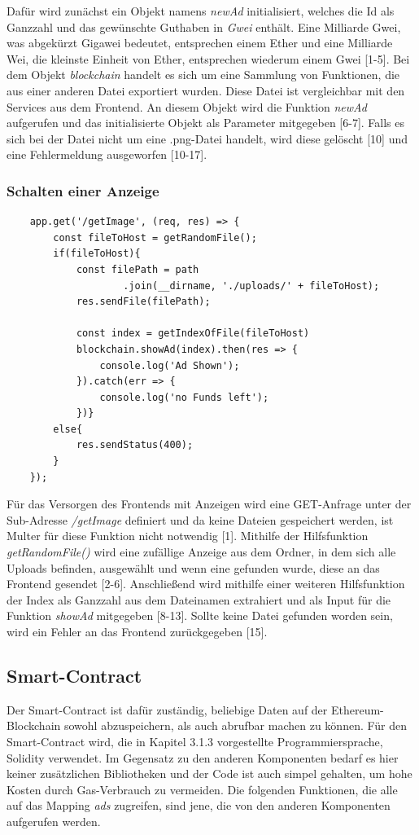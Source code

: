 Dafür wird zunächst ein Objekt namens \emph{newAd} initialisiert, welches die Id als Ganzzahl und das gewünschte Guthaben in \emph{Gwei} enthält. 
Eine Milliarde Gwei, was abgekürzt Gigawei bedeutet, entsprechen einem Ether und eine Milliarde Wei, die kleinste Einheit von Ether, entsprechen wiederum einem Gwei [1-5]. 
Bei dem Objekt \emph{blockchain} handelt es sich um eine Sammlung von Funktionen, die aus einer anderen Datei exportiert wurden. Diese Datei ist vergleichbar mit den Services aus dem Frontend. An diesem Objekt wird die Funktion \emph{newAd} aufgerufen und das initialisierte Objekt als Parameter mitgegeben [6-7].
Falls es sich bei der Datei nicht um eine .png-Datei handelt, wird diese gelöscht [10] und eine Fehlermeldung ausgeworfen [10-17].
\subsubsection{Schalten einer Anzeige}
\begin{lstlisting}
	app.get('/getImage', (req, res) => {
		const fileToHost = getRandomFile();
		if(fileToHost){
			const filePath = path
					.join(__dirname, './uploads/' + fileToHost);
			res.sendFile(filePath);
			
			const index = getIndexOfFile(fileToHost)
			blockchain.showAd(index).then(res => {
				console.log('Ad Shown');
			}).catch(err => {
				console.log('no Funds left');
			})}
		else{
			res.sendStatus(400);
		}
	});
\end{lstlisting}
Für das Versorgen des Frontends mit Anzeigen wird eine GET-Anfrage unter der Sub-Adresse \emph{/getImage} definiert und da keine Dateien gespeichert werden, ist Multer für diese Funktion nicht notwendig [1]. Mithilfe der Hilfsfunktion \emph{getRandomFile()} wird eine zufällige Anzeige aus dem Ordner, in dem sich alle Uploads befinden, ausgewählt und wenn eine gefunden wurde, diese an das Frontend gesendet [2-6]. Anschließend wird mithilfe einer weiteren Hilfsfunktion der Index als Ganzzahl aus dem Dateinamen extrahiert und als Input für die Funktion \emph{showAd} mitgegeben [8-13]. Sollte keine Datei gefunden worden sein, wird ein Fehler an das Frontend zurückgegeben [15].
\subsection{Smart-Contract}
Der Smart-Contract ist dafür zuständig, beliebige Daten auf der Ethereum-Blockchain sowohl abzuspeichern, als auch abrufbar machen zu können.
Für den Smart-Contract wird, die in Kapitel 3.1.3 vorgestellte Programmiersprache, Solidity verwendet. Im Gegensatz zu den anderen Komponenten bedarf es hier keiner zusätzlichen Bibliotheken und der Code ist auch simpel gehalten, um hohe Kosten durch Gas-Verbrauch zu vermeiden. Die folgenden Funktionen, die alle auf das Mapping \emph{ads} zugreifen, sind jene, die von den anderen Komponenten aufgerufen werden.
